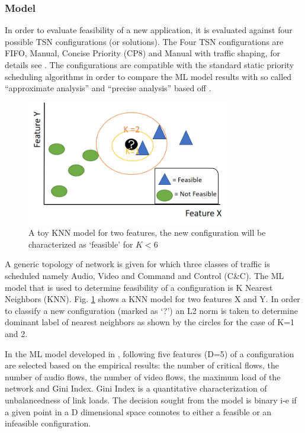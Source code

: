 \documentclass[journal,12pt,twocolumn]{IEEEtran}
\begin{document}
\subsubsection{Model}
In order to evaluate feasibility of a new application, it is evaluated against four possible TSN configurations (or solutions). The Four TSN configurations are FIFO, Manual, Concise Priority (CP8) and Manual with traffic shaping, for details see \cite{ML}. The configurations are compatible with the standard static priority scheduling algorithms in order to compare the ML model results with so called “approximate analysis” and “precise analysis'' based off  \cite{8,9,37}.
\begin{figure}
\centering
\includegraphics[width=3.5in]{KNN}
\caption{A toy KNN model for two features, the new configuration will be characterized as `feasible' for $K<6$}
\label{KNN}
\end{figure}

A generic topology of network is given for which three classes of traffic is scheduled namely Audio, Video and Command and Control (C\&C). The ML model that is used to determine feasibility of a configuration is K Nearest Neighbors (KNN). Fig. \ref{KNN} shows a KNN model for two features X and Y. In order to classify a new configuration (marked as `?') an L2 norm is taken to determine dominant label of nearest neighbors as shown by the circles for the case of K=1 and 2.

In the ML model developed in \cite{ML}, following five features (D=5) of a configuration are selected based on the empirical results: the number of critical flows, the number of audio flows, the number of video flows, the maximum load of the network and Gini Index. Gini Index \cite{GINI} is a quantitative characterization of unbalancedness of link loads. The decision sought from the model is binary i-e if a given point in a D dimensional space connotes to either a feasible or an infeasible configuration.
\end{document}
